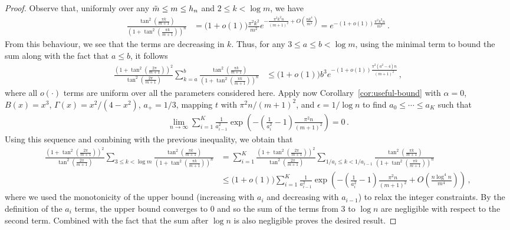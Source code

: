 \documentclass{article}
\newcommand{\1}{\mathbbm{1}}								%
\theoremstyle{definition}
\numberwithin{equation}{section}
\begin{document}
\begin{proof}
    Observe that, uniformly over any $\Tilde{m}\leq m\leq h_n$ and $2\leq k<\log m$, we have
    \begin{align*}
        \frac{\tan^2\left(\frac{\pi k}{m+1}\right)}{\left(1+\tan^2\left(\frac{\pi k}{m+1}\right)\right)^n}&=\big(1+o(1)\big)\frac{\pi^2k^2}{m^2}e^{-\frac{\pi^2k^2n}{(m+1)^2}+O\left(\frac{nk^4}{m^4}\right)}=e^{-(1+o(1))\frac{\pi^2k^2n}{m^2}}\,.
    \end{align*}
    From this behaviour, we see that the terms are decreasing in $k$.
    Thus, for any $3\leq a\leq b<\log m$, using the minimal term to bound the sum along with the fact that $a\leq b$, it follows
    \begin{align*}
        \frac{\left(1+\tan^2\left(\frac{2\pi}{m+1}\right)\right)^2}{\tan^2\left(\frac{2\pi}{m+1}\right)}\sum_{k=a}^b\frac{\tan^2\left(\frac{\pi k}{m+1}\right)}{\left(1+\tan^2\left(\frac{\pi k}{m+1}\right)\right)^n}&\leq\big(1+o(1)\big)b^3e^{-(1+o(1))\frac{\pi^2(a^2-4)n}{(m+1)^2}}\,,
    \end{align*}
    where all $o(\cdot)$ terms are uniform over all the parameters considered here.
    Apply now Corollary~\ref{cor:useful-bound} with $\alpha=0$, $B(x)=x^3$, $\Gamma(x)=x^2/(4-x^2)$, $a_+=1/3$, mapping $t$ with $\pi^2n/(m+1)^2$, and $\epsilon=1/\log n$ to find $a_0\leq\cdots\leq a_K$ such that
    \begin{align*}
        \lim_{n\rightarrow\infty}\sum_{i=1}^K\frac{1}{a_{i-1}^2}\exp\left(-\left(\frac{1}{a_i^2}-1\right)\frac{\pi^2n}{(m+1)^2}\right)=0\,.
    \end{align*}
    Using this sequence and combining with the previous inequality, we obtain that
    \begin{align*}
        \frac{\left(1+\tan^2\left(\frac{2\pi}{m+1}\right)\right)^2}{\tan^2\left(\frac{2\pi}{m+1}\right)}\sum_{3\leq k<\log m}\frac{\tan^2\left(\frac{\pi k}{m+1}\right)}{\left(1+\tan^2\left(\frac{\pi k}{m+1}\right)\right)^n}&=\sum_{i=1}^K\frac{\left(1+\tan^2\left(\frac{2\pi}{m+1}\right)\right)^2}{\tan^2\left(\frac{2\pi}{m+1}\right)}\sum_{1/a_i\leq k<1/a_{i-1}}\frac{\tan^2\left(\frac{\pi k}{m+1}\right)}{\left(1+\tan^2\left(\frac{\pi k}{m+1}\right)\right)^n}\\
        &\leq\big(1+o(1)\big)\sum_{i=1}^K\frac{1}{a_{i-1}^2}\exp\left(-\left(\frac{1}{a_i^2}-1\right)\frac{\pi^2n}{(m+1)^2}+O\left(\frac{n\log^4n}{m^4}\right)\right)\,,
    \end{align*}
    where we used the monotonicity of the upper bound (increasing with $a_i$ and decreasing with $a_{i-1}$) to relax the integer constraints.
    By the definition of the $a_i$ terms, the upper bound converges to $0$ and so the sum of the terms from $3$ to $\log n$ are negligible with respect to the second term.
    Combined with the fact that the sum after $\log n$ is also negligible proves the desired result.
\end{proof}
\end{document}

